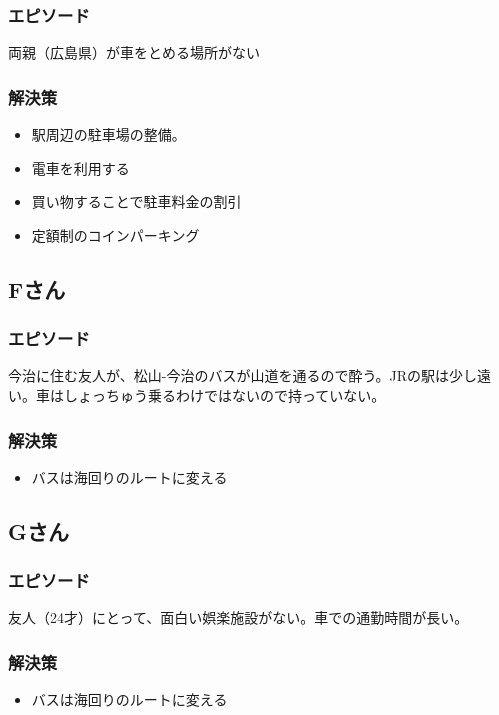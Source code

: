 \documentclass[a4paper,12pt, uplatex]{jsbook}
\begin{document}
\subsubsection{エピソード}
両親（広島県）が車をとめる場所がない

\subsubsection{解決策}
\begin{itemize}
  \item 駅周辺の駐車場の整備。
  \item 電車を利用する
  \item 買い物することで駐車料金の割引
  \item 定額制のコインパーキング
\end{itemize}


\subsection{Fさん}
\subsubsection{エピソード}
今治に住む友人が、松山-今治のバスが山道を通るので酔う。JRの駅は少し遠い。車はしょっちゅう乗るわけではないので持っていない。

\subsubsection{解決策}
\begin{itemize}
  \item バスは海回りのルートに変える
\end{itemize}


\subsection{Gさん}
\subsubsection{エピソード}
友人（24才）にとって、面白い娯楽施設がない。車での通勤時間が長い。

\subsubsection{解決策}
\begin{itemize}
  \item バスは海回りのルートに変える
\end{itemize}
\end{document}
